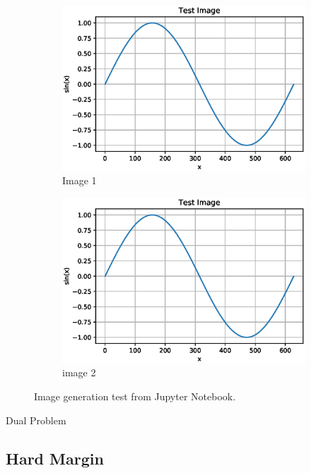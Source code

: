 \documentclass[10pt, a4paper]{amsart}
\begin{document}
\begin{figure}
	\centering	
	\begin{subfigure}{0.5\textwidth}
		\centering
		\includegraphics[width=1.0\textwidth]{test_image.eps}
		\caption{Image 1}
	\end{subfigure}%
	\begin{subfigure}{0.5\textwidth}
		\centering
		\includegraphics[width=1.0\textwidth]{test_image.eps}
		\caption{image 2}
	\end{subfigure}
	\caption{Image generation test from Jupyter Notebook.}
\end{figure}

Dual Problem

\subsection{Hard Margin}
\end{document}
